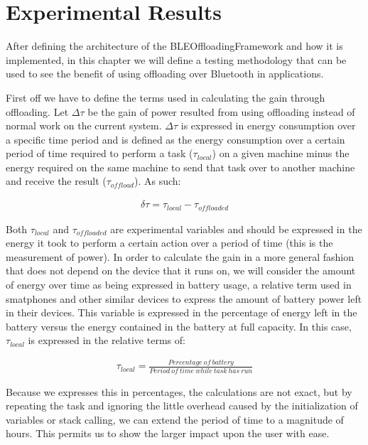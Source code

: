 \chapter{Experimental Results}
\label{chapter:results}

After defining the architecture of the BLEOffloadingFramework and how it is implemented, in this chapter we will define a testing methodology that can be used to see the benefit of using offloading over Bluetooth in applications.

First off we have to define the terms used in calculating the gain through offloading. Let \(\Delta\tau\) be the gain of power resulted from using offloading instead of normal work on the current system. \(\Delta\tau\) is expressed in energy consumption over a specific time period and is defined as the energy consumption over a certain period of time required to perform a task (\(\tau_{local}\)) on a given machine minus the energy required on the same machine to send that task over to another machine and receive the result (\(\tau_{offload}\)). As such:

\begin{align}\label{gainequation}
\delta\tau = \tau_{local} - \tau_{offloaded}
\end{align}

Both \(\tau_{local}\) and \(\tau_{offloaded}\) are experimental variables and should be expressed in the energy it took to perform a certain action over a period of time (this is the measurement of power). In order to calculate the gain in a more general fashion that does not depend on the device that it runs on, we will consider the amount of energy over time as being expressed in battery usage, a relative term used in smatphones and other similar devices to express the amount of battery power left in their devices. This variable is expressed in the percentage of energy left in the battery versus the energy contained in the battery at full capacity. In this case, \(\tau_{local}\) is expressed in the relative terms of:

\begin{align}
\tau_{local} = \tfrac{Percentage\ of\ battery}{Period\ of\ time\ while\ task\ has\ run}
\end{align}

Because we expresses this in percentages, the calculations are not exact, but by repeating the task and ignoring the little overhead caused by the initialization of variables or stack calling, we can extend the period of time to a magnitude of hours. This permits us to show the larger impact upon the user with ease.

